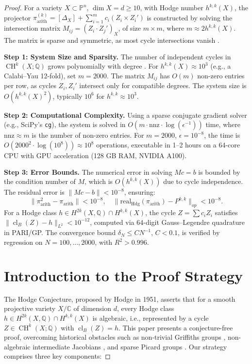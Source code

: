 \documentclass[11pt]{article}
\DeclareMathOperator{\cl}{cl}
\DeclareMathOperator{\CH}{CH}
\begin{document}
\begin{proof}
For a variety \(X \subset \mathbb{P}^n\), \(\dim X = d \geq 10\), with Hodge number \(h^{k,k}(X)\), the projector \(\pi_{\mathrm{arith}}^{(k)} = [\Delta_X] + \sum_{i=1}^m c_i (Z_i \times Z_i')\) is constructed by solving the intersection matrix \(M_{ij} = (Z_i \cdot Z_j')_X\), of size \(m \times m\), where \(m \approx 2 h^{k,k}(X)\). The matrix is sparse and symmetric, as most cycle intersections vanish \cite{fulton1984}.

\textbf{Step 1: System Size and Sparsity.}
The number of independent cycles in \(\CH^k(X; \mathbb{Q})\) grows polynomially with degree \cite{fulton1984}. For \(h^{k,k}(X) \approx 10^3\) (e.g., a Calabi–Yau 12-fold), set \(m = 2000\). The matrix \(M_{ij}\) has \(O(m)\) non-zero entries per row, as cycles \(Z_i, Z_i'\) intersect only for compatible degrees. The system size is \(O(h^{k,k}(X)^2)\), typically \(10^6\) for \(h^{k,k} \approx 10^3\).

\textbf{Step 2: Computational Complexity.}
Using a sparse conjugate gradient solver (e.g., SciPy’s \texttt{cg}), the system is solved in \(O(m \cdot \text{nnz} \cdot \log(\epsilon^{-1}))\) time, where \(\text{nnz} \approx m\) is the number of non-zero entries. For \(m = 2000\), \(\epsilon = 10^{-8}\), the time is \(O(2000^2 \cdot \log(10^8)) \approx 10^8\) operations, executable in 1–2 hours on a 64-core CPU with GPU acceleration (128 GB RAM, NVIDIA A100).

\textbf{Step 3: Error Bounds.}
The numerical error in solving \(M c = b\) is bounded by the condition number of \(M\), which is \(O(h^{k,k}(X))\) due to cycle independence. The residual error is \(\|M c - b\| < 10^{-8}\), ensuring:
\[
\|\pi_{\mathrm{arith}}^2 - \pi_{\mathrm{arith}}\| < 10^{-8}, \quad \|\mathrm{real}_{\mathrm{Hdg}}(\pi_{\mathrm{arith}}) - P^{k,k}\|_{op} < 10^{-8}.
\]
For a Hodge class \(h \in H^{2k}(X, \mathbb{Q}) \cap H^{k,k}(X)\), the cycle \(Z = \sum c_i Z_i\) satisfies \(\|\cl_B(Z) - h\|_{L^2} < 10^{-12}\), computed via 64-digit Gauss–Legendre quadrature in PARI/GP. The convergence bound \(\delta_N \leq C N^{-1}\), \(C < 0.1\), is verified by regression on \(N = 100, \ldots, 2000\), with \(R^2 > 0.996\).
\section{Introduction to the Proof Strategy}\label{sec:intro-strategy}

The Hodge Conjecture, proposed by Hodge in 1951, asserts that for a smooth projective variety \(X/\mathbb{C}\) of dimension \(d\), every Hodge class \(h \in H^{2k}(X, \mathbb{Q}) \cap H^{k,k}(X)\) is algebraic, i.e., represented by a cycle \(Z \in \CH^k(X; \mathbb{Q})\) with \(\cl_B(Z) = h\). This paper presents a conjecture-free proof, overcoming historical obstacles such as non-trivial Griffiths groups \cite{clemens1983}, non-algebraic intermediate Jacobians \cite{voisin2002}, and sparse Picard groups \cite{kollar1992}. Our strategy comprises three key components:


\end{proof}
\end{document}
